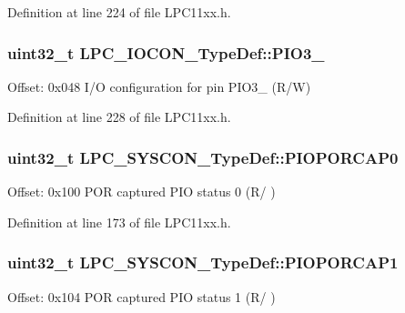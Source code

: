 Definition at line 224 of file L\+P\+C11xx.\+h.

\subsubsection[{\texorpdfstring{P\+I\+O3\+\_\+5}{PIO3_5}}]{ uint32\+\_\+t L\+P\+C\+\_\+\+I\+O\+C\+O\+N\+\_\+\+Type\+Def\+::\+P\+I\+O3\+\_}\hypertarget{group___l_p_c11xx___definitions_ga979251234fed038c221e650f2ccaf8ae}{}\label{group___l_p_c11xx___definitions_ga979251234fed038c221e650f2ccaf8ae}
Offset\+: 0x048 I/O configuration for pin P\+I\+O3\+\_ (R/W) 

Definition at line 228 of file L\+P\+C11xx.\+h.

\subsubsection[{\texorpdfstring{P\+I\+O\+P\+O\+R\+C\+A\+P0}{PIOPORCAP0}}]{ uint32\+\_\+t L\+P\+C\+\_\+\+S\+Y\+S\+C\+O\+N\+\_\+\+Type\+Def\+::\+P\+I\+O\+P\+O\+R\+C\+A\+P0}\hypertarget{group___l_p_c11xx___definitions_gaf602252d93ac876feb330a5710324f43}{}\label{group___l_p_c11xx___definitions_gaf602252d93ac876feb330a5710324f43}
Offset\+: 0x100 P\+OR captured P\+IO status 0 (R/ ) 

Definition at line 173 of file L\+P\+C11xx.\+h.

\subsubsection[{\texorpdfstring{P\+I\+O\+P\+O\+R\+C\+A\+P1}{PIOPORCAP1}}]{ uint32\+\_\+t L\+P\+C\+\_\+\+S\+Y\+S\+C\+O\+N\+\_\+\+Type\+Def\+::\+P\+I\+O\+P\+O\+R\+C\+A\+P1}\hypertarget{group___l_p_c11xx___definitions_gada09efd8706154dd5e6d2675e612619f}{}\label{group___l_p_c11xx___definitions_gada09efd8706154dd5e6d2675e612619f}
Offset\+: 0x104 P\+OR captured P\+IO status 1 (R/ ) 

